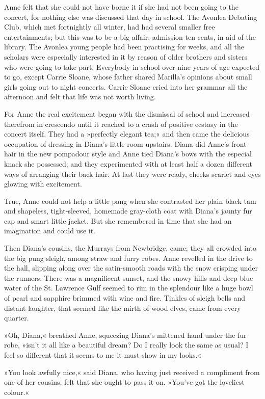 Anne felt that she could not have borne it if she had not been going to the concert, for nothing else was discussed that day in school. The Avonlea Debating Club, which met fortnightly all winter, had had several smaller free entertainments; but this was to be a big affair, admission ten cents, in aid of the library. The Avonlea young people had been practising for weeks, and all the scholars were especially interested in it by reason of older brothers and sisters who were going to take part. Everybody in school over nine years of age expected to go, except Carrie Sloane, whose father shared Marilla's opinions about small girls going out to night concerts. Carrie Sloane cried into her grammar all the afternoon and felt that life was not worth living.

For Anne the real excitement began with the dismissal of school and increased therefrom in crescendo until it reached to a crash of positive ecstasy in the concert itself. They had a »perfectly elegant tea;« and then came the delicious occupation of dressing in Diana's little room upstairs. Diana did Anne's front hair in the new pompadour style and Anne tied Diana's bows with the especial knack she possessed; and they experimented with at least half a dozen different ways of arranging their back hair. At last they were ready, cheeks scarlet and eyes glowing with excitement.

True, Anne could not help a little pang when she contrasted her plain black tam and shapeless, tight-sleeved, homemade gray-cloth coat with Diana's jaunty fur cap and smart little jacket. But she remembered in time that she had an imagination and could use it.

Then Diana's cousins, the Murrays from Newbridge, came; they all crowded into the big pung sleigh, among straw and furry robes. Anne revelled in the drive to the hall, slipping along over the satin-smooth roads with the snow crisping under the runners. There was a magnificent sunset, and the snowy hills and deep-blue water of the St. Lawrence Gulf seemed to rim in the splendour like a huge bowl of pearl and sapphire brimmed with wine and fire. Tinkles of sleigh bells and distant laughter, that seemed like the mirth of wood elves, came from every quarter.

»Oh, Diana,« breathed Anne, squeezing Diana's mittened hand under the fur robe, »isn't it all like a beautiful dream? Do I really look the same as usual? I feel so different that it seems to me it must show in my looks.«

»You look awfully nice,« said Diana, who having just received a compliment from one of her cousins, felt that she ought to pass it on. »You've got the loveliest colour.«

